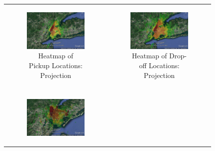 \documentclass{article}
\begin{document}
\begin{figure}

\begin{tabular}{cc}

\begin{subfigure}{.5\linewidth}
  \centering
  \includegraphics[width=.8\linewidth]{pickup_overhead.jpg}
  \caption{Heatmap of Pickup Locations: Projection}
  \label{sub:pu_oh}
\end{subfigure} & 
\begin{subfigure}{.5\linewidth}
  \centering
  \includegraphics[width=.8\linewidth]{dropoff_overhead.jpg}
  \caption{Heatmap of Drop-off Locations: Projection}
  \label{sub:do_oh}
\end{subfigure} \\\\
\begin{subfigure}{.5\linewidth}
  \centering
  \includegraphics[width=.8\linewidth]{pickup_ne.jpg}

\end{subfigure}
\end{tabular}
\end{figure}
\end{document}
